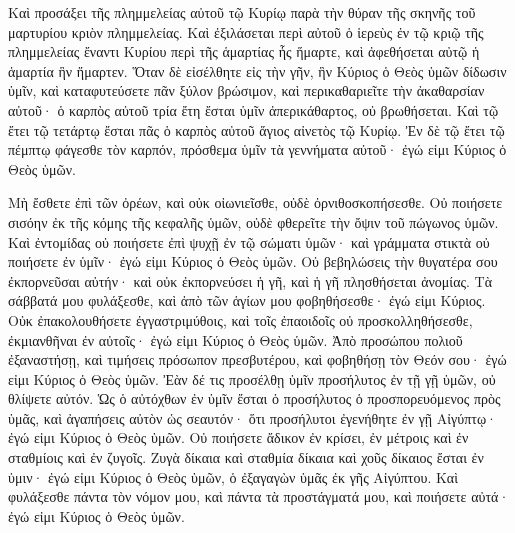 {Καὶ προσάξει τῆς πλημμελείας αὐτοῦ τῷ Κυρίῳ παρὰ τὴν θύραν τῆς σκηνῆς τοῦ μαρτυρίου κριὸν πλημμελείας.
Καὶ ἐξιλάσεται περὶ αὐτοῦ ὁ ἱερεὺς ἐν τῷ κριῷ τῆς πλημμελείας ἔναντι Κυρίου περὶ τῆς ἁμαρτίας ἧς ἥμαρτε, καὶ ἀφεθήσεται αὐτῷ ἡ ἁμαρτία ἣν ἥμαρτεν.
Ὅταν δὲ εἰσέλθητε εἰς τὴν γῆν, ἣν Κύριος ὁ Θεὸς ὑμῶν δίδωσιν ὑμῖν, καὶ καταφυτεύσετε πᾶν ξύλον βρώσιμον, καὶ περικαθαριεῖτε τὴν ἀκαθαρσίαν αὐτοῦ· ὁ καρπὸς αὐτοῦ τρία ἔτη ἔσται ὑμῖν ἀπερικάθαρτος, οὐ βρωθήσεται.
Καὶ τῷ ἔτει τῷ τετάρτῳ ἔσται πᾶς ὁ καρπὸς αὐτοῦ ἅγιος αἰνετὸς τῷ Κυρίῳ.
Ἐν δὲ τῷ ἔτει τῷ πέμπτῳ φάγεσθε τὸν καρπόν, πρόσθεμα ὑμῖν τὰ γεννήματα αὐτοῦ· ἐγώ εἰμι Κύριος ὁ Θεὸς ὑμῶν.
\par }{\PP {}Μὴ ἔσθετε ἐπὶ τῶν ὀρέων, καὶ οὐκ οἰωνιεῖσθε, οὐδὲ ὀρνιθοσκοπήσεσθε.
Οὐ ποιήσετε σισόην ἐκ τῆς κόμης τῆς κεφαλῆς ὑμῶν, οὐδὲ φθερεῖτε τὴν ὄψιν τοῦ πώγωνος ὑμῶν.
Καὶ ἐντομίδας οὐ ποιήσετε ἐπὶ ψυχῇ ἐν τῷ σώματι ὑμῶν· καὶ γράμματα στικτὰ οὐ ποιήσετε ἐν ὑμῖν· ἐγώ εἰμι Κύριος ὁ Θεὸς ὑμῶν.
Οὐ βεβηλώσεις τὴν θυγατέρα σου ἐκπορνεῦσαι αὐτήν· καὶ οὐκ ἐκπορνεύσει ἡ γῆ, καὶ ἡ γῆ πλησθήσεται ἀνομίας.
Τὰ σάββατά μου φυλάξεσθε, καὶ ἀπὸ τῶν ἁγίων μου φοβηθήσεσθε· ἐγώ εἰμι Κύριος.
Οὐκ ἐπακολουθήσετε ἐγγαστριμύθοις, καὶ τοῖς ἐπαοιδοῖς οὐ προσκολληθήσεσθε, ἐκμιανθῆναι ἐν αὐτοῖς· ἐγώ εἰμι Κύριος ὁ Θεὸς ὑμῶν.
Ἀπὸ προσώπου πολιοῦ ἐξαναστήσῃ, καὶ τιμήσεις πρόσωπον πρεσβυτέρου, καὶ φοβηθήσῃ τὸν Θεόν σου· ἐγώ εἰμι Κύριος ὁ Θεὸς ὑμῶν.
Ἐὰν δέ τις προσέλθῃ ὑμῖν προσήλυτος ἐν τῇ γῇ ὑμῶν, οὐ θλίψετε αὐτόν.
Ὡς ὁ αὐτόχθων ἐν ὑμῖν ἔσται ὁ προσήλυτος ὁ προσπορευόμενος πρὸς ὑμᾶς, καὶ ἀγαπήσεις αὐτὸν ὡς σεαυτόν· ὅτι προσήλυτοι ἐγενήθητε ἐν γῇ Αἰγύπτῳ· ἐγώ εἰμι Κύριος ὁ Θεὸς ὑμῶν.
Οὐ ποιήσετε ἄδικον ἐν κρίσει, ἐν μέτροις καὶ ἐν σταθμίοις καὶ ἐν ζυγοῖς.
Ζυγὰ δίκαια καὶ σταθμία δίκαια καὶ χοῦς δίκαιος ἔσται ἐν ὑμιν· ἐγώ εἰμι Κύριος ὁ Θεὸς ὑμῶν, ὁ ἐξαγαγὼν ὑμᾶς ἐκ γῆς Αἰγύπτου.
Καὶ φυλάξεσθε πάντα τὸν νόμον μου, καὶ πάντα τὰ προστάγματά μου, καὶ ποιήσετε αὐτά· ἐγώ εἰμι Κύριος ὁ Θεὸς ὑμῶν.

}
